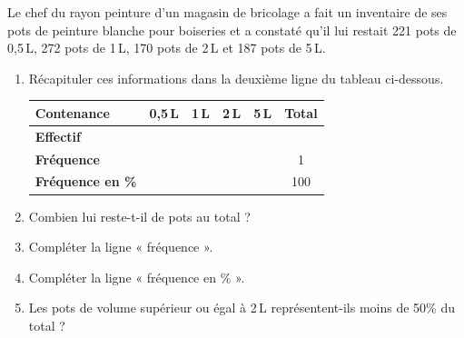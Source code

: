 \documentclass[a4paper]{book}
\begin{document}
    \begin{exercice}
        Le chef du rayon peinture d'un magasin de bricolage a fait un inventaire de ses pots de peinture blanche pour boiseries et a constaté qu'il lui restait 221 pots de 0,5\,L, 272 pots de 1\,L, 170 pots de 2\,L et 187 pots de 5\,L.
        
        \begin{enumerate}
            \item Récapituler ces informations dans la deuxième ligne du tableau ci-dessous.
            
            \begin{center}
                \begin{tabular}{l|c|c|c|c|c}
                    \toprule
                    \textbf{Contenance} & \textbf{0,5\,L} & \textbf{1\,L} & \textbf{2\,L} & \textbf{5\,L} & \textbf{Total} \\
                    \midrule
                    \textbf{Effectif} & & & & & \\
                    \midrule
                    \textbf{Fréquence} & & & & & 1 \\
                    \textbf{Fréquence en \%} & & & & & 100 \\
                    \bottomrule
                \end{tabular}
            \end{center}
            
            \item Combien lui reste-t-il de pots au total ?
            
            \item Compléter la ligne « fréquence ».
            
            \item Compléter la ligne « fréquence en \% ».
            
            \item Les pots de volume supérieur ou égal à 2\,L représentent-ils moins de 50\% du total ?
        \end{enumerate}
    \end{exercice}
\end{document}
